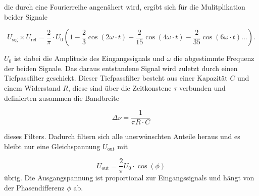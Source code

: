 die durch eine Fourierreihe angenähert wird, ergibt sich für die Mulitplikation beider Signale 

\begin{equation}
    U_\text{sig} \times U_\text{ref} = \frac{2}{\pi} \cdot U_0 \left(1 - \frac{2}{3}\cos{\left(2\omega \cdot t\right)}  -  \frac{2}{15}\cos{\left(4\omega \cdot t\right)} - \frac{2}{35}\cos{\left(6\omega \cdot t\right)}...\right).
    \label{eq:u_ref_sig}
\end{equation}

$U_0$ ist dabei die Amplitude des Eingangssignals und $\omega$ die abgestimmte Frequenz der beiden Signale.
Das daraus entstandene Signal wird zuletzt durch einen Tiefpassfilter geschickt.
Dieser Tiefpassfilter besteht aus einer Kapazität $C$ und einem Widerstand $R$, diese sind über die Zeitkonstene $\tau$ verbunden und definierten zusammen die Bandbreite

\begin{equation}
    \Delta \nu = \frac{1}{\pi R \cdot C}
    \label{eq:tau}
\end{equation}

dieses Filters.
Dadurch filtern sich alle unerwünschten Anteile heraus und es bleibt nur eine Gleichspannung $U_\text{out}$ mit 

\begin{equation}
    U_\text{out} = \frac{2}{\pi} U_0 \cdot \cos{\left(\phi\right)}
    \label{eq:u_out}
\end{equation}
übrig.
Die Ausgangspannung ist proportional zur Eingangssignals und hängt von der Phasendifferenz $\phi$ ab. 
